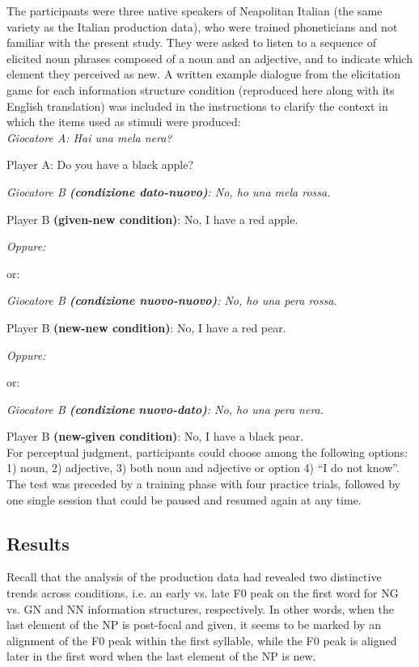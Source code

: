 The participants were three native speakers of Neapolitan Italian (the same variety as the Italian production data), who were trained phoneticians and not familiar with the present study. They were asked to listen to a sequence of elicited noun phrases composed of a noun and an adjective, and to indicate which element they perceived as new. A written example dialogue from the elicitation game for each information structure condition (reproduced here along with its English translation) was included in the instructions to clarify the context in which the items used as stimuli were produced:\\

\textit{Giocatore A: Hai una mela nera?}

Player A: Do you have a black apple? \medskip

\textit{Giocatore B \textbf{(condizione dato-nuovo)}: No, ho una mela rossa.}

Player B \textbf{(given-new condition)}: No, I have a red apple. \medskip

\textit{Oppure:}

or: \medskip

\textit{Giocatore B \textbf{(condizione nuovo-nuovo)}: No, ho una pera rossa.}

Player B \textbf{(new-new condition)}: No, I have a red pear. \medskip

\textit{Oppure:}

or: \medskip

\textit{Giocatore B \textbf{(condizione} \textbf{nuovo-dato)}: No, ho una pera nera.}

Player B \textbf{(new-given condition)}: No, I have a black pear.\\

For perceptual judgment, participants could choose among the following options: 1) noun, 2) adjective, 3) both noun and adjective or option 4) “I do not know”. The test was preceded by a training phase with four practice trials, followed by one single session that could be paused and resumed again at any time.

\subsection{Results}
\label{sec:2.4.2}
Recall that the analysis of the production data had revealed two distinctive trends across conditions, i.e. an early vs. late F0 peak on the first word for NG vs. GN and NN information structures, respectively. In other words, when the last element of the NP is post-focal and given, it seems to be marked by an alignment of the F0 peak within the first syllable, while the F0 peak is aligned later in the first word when the last element of the NP is new.

